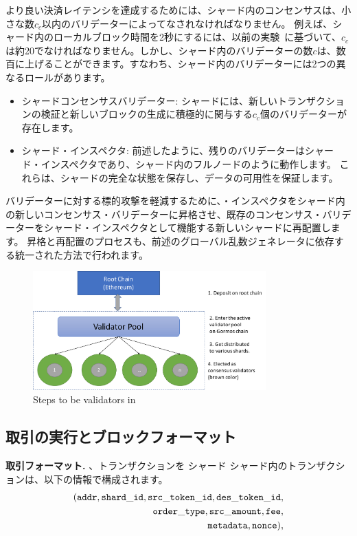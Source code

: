 より良い決済レイテンシを達成するためには、シャード内のコンセンサスは、小さな数$c_c$以内のバリデーターによってなされなければなりません。 例えば、シャード内のローカルブロック時間を2秒にするには、以前の実験~\cite{elastico}に基づいて、$c_c$は約20でなければなりません。しかし、シャード内のバリデーターの数$c$は、数百に上げることができます。すなわち、シャード内のバリデーターには2つの異なるロールがあります。

\begin{itemize}
\item シャードコンセンサスバリデーター: シャードには、新しいトランザクションの検証と新しいブロックの生成に積極的に関与する$c_c$個のバリデーターが存在します。
\item シャード・インスペクタ: 前述したように、残りのバリデーターはシャード・インスペクタであり、シャード内のフルノードのように動作します。 これらは、シャードの完全な状態を保存し、データの可用性を保証します。
\end{itemize}

バリデーターに対する標的攻撃を軽減するために、・インスペクタをシャード内の新しいコンセンサス・バリデーターに昇格させ、既存のコンセンサス・バリデーターをシャード・インスペクタとして機能する新しいシャードに再配置します。 昇格と再配置のプロセスも、前述のグローバル乱数ジェネレータに依存する統一された方法で行われます。

\begin{figure}[t]
  \centering
  \includegraphics[width=0.8\textwidth]{images/validator}
  \caption{Steps to be validators in \codename}
  \label{fig:validator}
\end{figure}

\subsection{取引の実行とブロックフォーマット}

\textbf{取引フォーマット.} 、トランザクションを
シャード シャード内のトランザクションは、以下の情報で構成されます。
\begin{align*}
({\mathtt{addr}}, {\mathtt{shard\_id}}, {\mathtt{src\_token\_id}}, {\mathtt{des\_token\_id}}, \\ {\mathtt{order\_type}}, {\mathtt{src\_amount}}, {\mathtt{fee}}, \\ {\mathtt{metadata}}, {\mathtt{nonce}}),
\end{align*}

